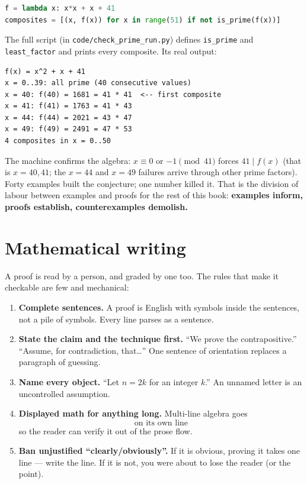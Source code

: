 \begin{lstlisting}[language=Python,caption={\texttt{check\_prime\_run.py}:
where does the $x^2 + x + 41$ prime streak break?},
label={lst:euler}]
f = lambda x: x*x + x + 41
composites = [(x, f(x)) for x in range(51) if not is_prime(f(x))]
\end{lstlisting}
The full script (in \texttt{code/check\_prime\_run.py}) defines \texttt{is\_prime}
and \texttt{least\_factor} and prints every composite. Its real output:
\begin{lstlisting}[numbers=none]
f(x) = x^2 + x + 41
x = 0..39: all prime (40 consecutive values)
x = 40: f(40) = 1681 = 41 * 41  <-- first composite
x = 41: f(41) = 1763 = 41 * 43
x = 44: f(44) = 2021 = 43 * 47
x = 49: f(49) = 2491 = 47 * 53
4 composites in x = 0..50
\end{lstlisting}

The machine confirms the algebra: $x \equiv 0$ or $-1 \pmod{41}$ forces
$41 \mid f(x)$ (that is $x = 40, 41$; the $x = 44$ and $x = 49$ failures
arrive through other prime factors). Forty examples built the conjecture;
one number killed it. That is the division of labour between examples and
proofs for the rest of this book: \textbf{examples inform, proofs establish,
counterexamples demolish.}

\section{Mathematical writing}\label{sec:writing}

A proof is read by a person, and graded by one too. The rules that make it
checkable are few and mechanical:

\begin{rulebox}
\begin{enumerate}
\item \textbf{Complete sentences.} A proof is English with symbols inside the
sentences, not a pile of symbols. Every line parses as a sentence.
\item \textbf{State the claim and the technique first.} ``We prove the
contrapositive.'' ``Assume, for contradiction, that\dots'' One sentence of
orientation replaces a paragraph of guessing.
\item \textbf{Name every object.} ``Let $n = 2k$ for an integer $k$.'' An
unnamed letter is an uncontrolled assumption.
\item \textbf{Displayed math for anything long.} Multi-line algebra goes
\[ \text{on its own line} \]
so the reader can verify it out of the prose flow.
\item \textbf{Ban unjustified ``clearly/obviously''.} If it is obvious, proving
it takes one line --- write the line. If it is not, you were about to lose the
reader (or the point).
\end{enumerate}
\end{rulebox}

